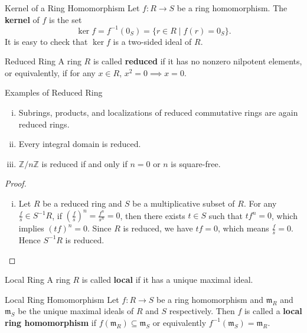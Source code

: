 \begin{definition}{Kernel of a Ring Homomorphism}{}
    Let $f:R\to S$ be a ring homomorphism. The \textbf{kernel} of $f$ is the set
    \[
        \ker f=f^{-1}(0_S)=\{r\in R\mid f(r)=0_S\}.
    \]
    It is easy to check that $\ker f$ is a two-sided ideal of $R$.
\end{definition}


\begin{definition}{Reduced Ring}{}
    A ring $R$ is called \textbf{reduced} if it has no nonzero nilpotent elements, or equivalently, if for any $x\in R$, $x^2=0\implies x=0$.
\end{definition}


\begin{proposition}{Examples of Reduced Ring}{}
    \begin{enumerate}[(i)]
        \item Subrings, products, and localizations of reduced commutative rings are again reduced rings.
        \item Every integral domain is reduced.
        \item $\mathbb{Z}/n\mathbb{Z}$ is reduced if and only if $n=0$ or $n$ is square-free.
    \end{enumerate}
\end{proposition}
\begin{proof}
    \begin{enumerate}[(i)]
        \item Let $R$ be a reduced ring and $S$ be a  multiplicative subset of $R$. For any $\frac{f}{s}\in S^{-1}R$, if $\left(\frac{f}{s}\right)^n=\frac{f^n}{s^n}=0$, then there exists $t\in S$ such that $tf^n=0$, which implies $(tf)^n=0$. Since $R$ is reduced, we have $tf=0$, which means $\frac{f}{s}=0$. Hence $S^{-1}R$ is reduced.
    \end{enumerate}
\end{proof}


\begin{definition}{Local Ring}{}
    A ring $R$ is called \textbf{local} if it has a unique maximal ideal.
\end{definition}

\begin{definition}{Local Ring Homomorphism}{}
    Let $f:R\to S$ be a ring homomorphism and $\mathfrak{m}_R$ and $\mathfrak{m}_S$ be the unique maximal ideals of $R$ and $S$ respectively. Then $f$ is called a \textbf{local ring homomorphism} if $f(\mathfrak{m}_R)\subseteq \mathfrak{m}_S$ or equivalently $f^{-1}(\mathfrak{m}_S)=\mathfrak{m}_R$.
\end{definition}

